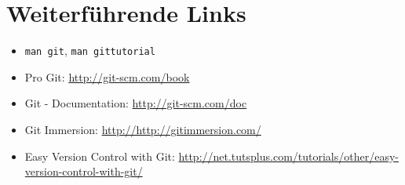 \section{Weiterführende Links}
\begin{itemize}
  \item \texttt{man git}, \texttt{man gittutorial}
  \item Pro Git: \url{http://git-scm.com/book}
  \item Git - Documentation: \url{http://git-scm.com/doc}
  \item Git Immersion: \url{http://http://gitimmersion.com/}
  \item Easy Version Control with Git: \url{http://net.tutsplus.com/tutorials/other/easy-version-control-with-git/}
\end{itemize}
